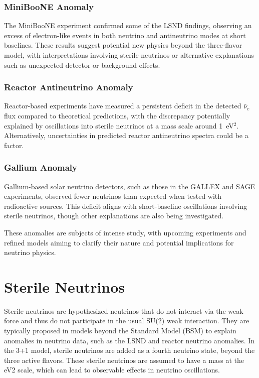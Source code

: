 \documentclass[a4paper,12pt,numbered]{article}
\begin{document}
\subsubsection{MiniBooNE Anomaly}  
The MiniBooNE experiment confirmed some of the LSND findings, observing an excess of electron-like events in both neutrino and antineutrino modes at short baselines. These results suggest potential new physics beyond the three-flavor model, with interpretations involving sterile neutrinos or alternative explanations such as unexpected detector or background effects.

\subsubsection{Reactor Antineutrino Anomaly}  
Reactor-based experiments have measured a persistent deficit in the detected $\bar{\nu}_e$ flux compared to theoretical predictions, with the discrepancy potentially explained by oscillations into sterile neutrinos at a mass scale around 1~eV$^2$. Alternatively, uncertainties in predicted reactor antineutrino spectra could be a factor.

\subsubsection{Gallium Anomaly}  
Gallium-based solar neutrino detectors, such as those in the GALLEX and SAGE experiments, observed fewer neutrinos than expected when tested with radioactive sources. This deficit aligns with short-baseline oscillations involving sterile neutrinos, though other explanations are also being investigated.

These anomalies are subjects of intense study, with upcoming experiments and refined models aiming to clarify their nature and potential implications for neutrino physics.


\section{Sterile Neutrinos}

Sterile neutrinos are hypothesized neutrinos that do not interact via the weak force and thus do not participate in the usual SU(2) weak interaction. They are typically proposed in models beyond the Standard Model (BSM) to explain anomalies in neutrino data, such as the LSND and reactor neutrino anomalies. In the 3+1 model, sterile neutrinos are added as a fourth neutrino state, beyond the three active flavors. These sterile neutrinos are assumed to have a mass at the eV2 scale, which can lead to observable effects in neutrino oscillations.
\end{document}
